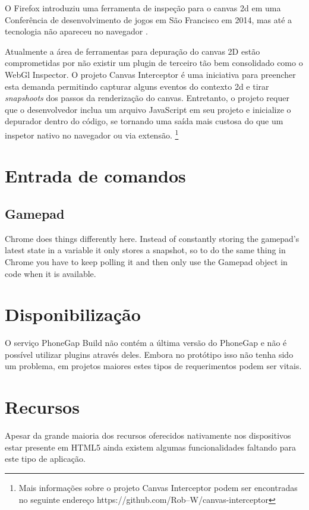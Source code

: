 O Firefox introduziu uma ferramenta de inspeção para o canvas 2d
em uma Conferência de desenvolvimento de jogos em São Francisco em 2014,
mas até a tecnologia não apareceu no navegador \autocite{firefoxCanvasDebug}.

Atualmente a área de ferramentas para depuração do canvas 2D estão
comprometidas por não existir um plugin de terceiro tão bem
consolidado como o WebGl Inspector. O projeto Canvas Interceptor é
uma iniciativa para preencher esta demanda permitindo capturar alguns
eventos do contexto 2d e tirar \textit{snapshoots} dos passos da renderização
do canvas. Entretanto, o projeto requer que o desenvolvedor inclua
um arquivo JavaScript em seu projeto e inicialize o depurador dentro do código,
se tornando uma saída mais custosa do que um inspetor nativo no
navegador ou via extensão. \footnote{Mais informações sobre o
projeto Canvas Interceptor podem ser encontradas no seguinte endereço
https://github.com/Rob--W/canvas-interceptor}

\section{Entrada de comandos}

\subsection{Gamepad}
Chrome does things differently here. Instead of constantly storing the gamepad's latest state in a variable it only stores a snapshot, so to do the same thing in Chrome you have to keep polling it and then only use the Gamepad object in code when it is available.

\section{Disponibilização}

O serviço PhoneGap Build não contém a última versão do PhoneGap e
não é possível utilizar plugins através deles. Embora no protótipo
isso não tenha sido um problema, em projetos maiores estes tipos de
requerimentos podem ser vitais.

\section{Recursos}
Apesar da grande maioria dos recursos oferecidos nativamente
nos dispositivos estar presente em HTML5 ainda existem algumas
funcionalidades faltando para este tipo de aplicação.

